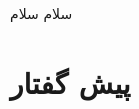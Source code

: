 \documentclass[11pt, oneside]{article}
\begin{document}
سلام سلام
\tableofcontents

\section{پیش گفتار}






\end{document}
